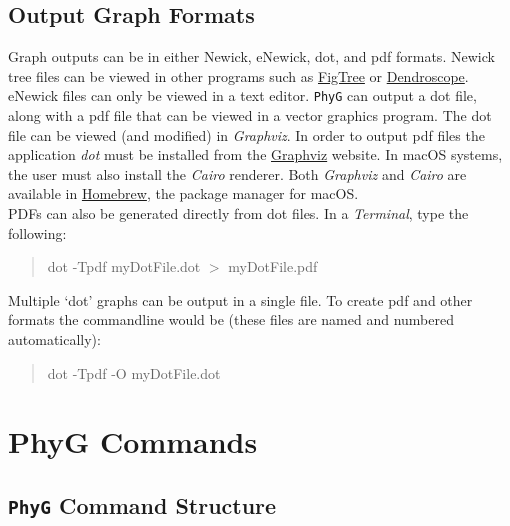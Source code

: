 \documentclass[11pt]{book}
\newcommand{\phyg}{\texttt{PhyG} }
\begin{document}
{{\section{Output Graph Formats}
\label{sec:outputgraphs}
	Graph outputs can be in either Newick, eNewick, dot, and pdf formats. Newick 
	tree files can be viewed in other programs such as \href{http://tree.bio.ed.ac.uk/software/figtree/}
	{FigTree} or \href{http:/https://uni-tuebingen.de/fakultaeten/mathematisch-naturwissenschaftliche-fakultaet/fachbereiche/informatik/lehrstuehle/algorithms-in-bioinformatics/software/}
	{Dendroscope}. eNewick files can only be viewed in a text editor. \phyg can output a dot 
	file, along with a pdf file that can be viewed in a vector graphics program. The dot file can 
	be viewed (and modified) in \textit{Graphviz}. In order to output pdf files the application 
	\textit{dot} must be installed from the \href{https://graphviz.org/download/}{Graphviz} website. 
	In macOS systems, the user must also install the \textit{Cairo} renderer. Both \textit{Graphviz} 
	and \textit{Cairo} are available in \href{https://brew.sh/}{Homebrew}, the package manager 
	for macOS.\\

	\noindent PDFs can also be generated directly from dot files. In a \textit{Terminal}, 
	type the following: 

	\begin{quote}
	dot -Tpdf myDotFile.dot $>$ myDotFile.pdf
	\end{quote}
		
	\noindent Multiple `dot' graphs can be output in a single file. To create pdf and 
	other formats the commandline would be (these files are named and numbered 
	automatically):
	
	\begin{quote}
	dot -Tpdf -O myDotFile.dot
	\end{quote}


	
\chapter{PhyG Commands}

\section{\phyg Command Structure}
		 
}}
\end{document}
